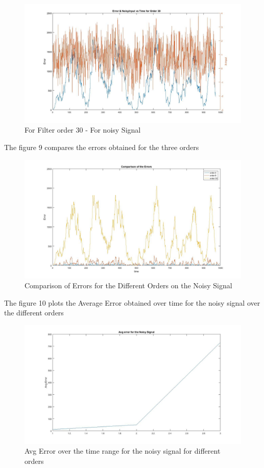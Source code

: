 \documentclass[10pt, letterpaper]{article}
\begin{document}
\begin{enumerate}
\begin{figure}
\end{figure}
\begin{figure}
\centering
\label{fig:thirty1}
\caption{For Filter order 30 - For noisy Signal}
\includegraphics[scale=0.25]{MSE3_Noisy}
\end{figure}

The figure 9 compares the errors obtained for the three orders 
\begin{figure}
\centering
\label{fig:ErrorComparison}
\caption{Comparison of Errors for the Different Orders on the Noisy Signal}
\includegraphics[scale=0.25]{ComparisonOfErrors.jpg}
\end{figure}

The figure 10 plots the Average Error obtained over time for the noisy signal over the different orders
\begin{figure}
\centering
\label{fig:AvgErrorComparison}
\caption{Avg Error over the time range for the noisy signal for different orders}
\includegraphics[scale=0.25]{AvgErrorForNoisySignal.jpg}
\end{figure}


\end{enumerate}
\end{document}
